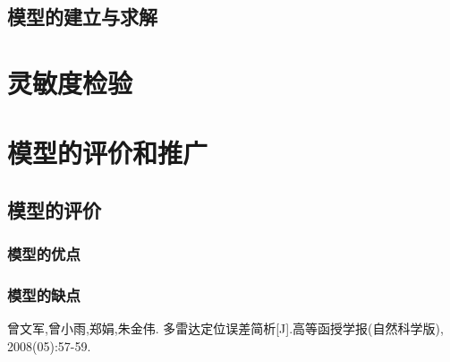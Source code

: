 \documentclass[withoutpreface,bwprint]{cumcmthesis} %
\begin{document}
\subsection{模型的建立与求解}



\section{灵敏度检验}

\section{模型的评价和推广}
\subsection{模型的评价}
\subsubsection{模型的优点}

\subsubsection{模型的缺点}
   

\begin{thebibliography}{9}%
曾文军,曾小雨,郑娟,朱金伟.
    多雷达定位误差简析[J].高等函授学报(自然科学版),
    2008(05):57-59.

\end{thebibliography}
\end{document}
